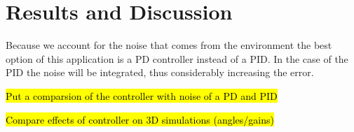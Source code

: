 \chapter{Results and Discussion}\label{ch:results}

Because we account for the noise that comes from the environment the best option of this application is a PD controller instead of a PID. In the case of the PID the noise will be integrated, thus considerably increasing the error. 

\hl{Put a comparsion of the controller with noise of a PD and PID} 

\hl{Compare effects of controller on 3D simulations (angles/gains)}